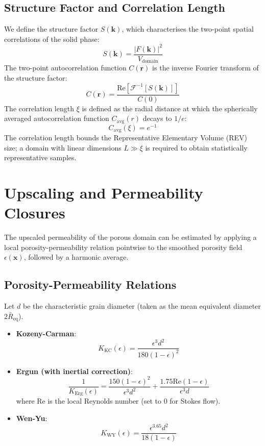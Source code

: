 \documentclass[preprint,12pt]{elsarticle}
\newcommand{\x}{\mathbf{x}}
\newcommand{\kvec}{\mathbf{k}}
\begin{document}
\subsection{Structure Factor and Correlation Length}
We define the structure factor $S(\kvec)$, which characterises the two-point spatial correlations of the solid phase:
\begin{equation}
S(\kvec) = \frac{|F(\kvec)|^2}{V_{\text{domain}}}
\end{equation}
The two-point autocorrelation function $C(\mathbf{r})$ is the inverse Fourier transform of the structure factor:
\begin{equation}
C(\mathbf{r}) = \frac{\text{Re}\left[ \mathcal{F}^{-1}[S(\kvec)] \right]}{C(0)}
\end{equation}
The correlation length $\xi$ is defined as the radial distance at which the spherically averaged autocorrelation function $C_{\text{avg}}(r)$ decays to $1/e$:
\begin{equation}
C_{\text{avg}}(\xi) = e^{-1}
\end{equation}
The correlation length bounds the Representative Elementary Volume (REV) size; a domain with linear dimensions $L \gg \xi$ is required to obtain statistically representative samples.

\section{Upscaling and Permeability Closures}
\label{sec:upscaling}

The upscaled permeability of the porous domain can be estimated by applying a local porosity-permeability relation pointwise to the smoothed porosity field $\epsilon(\x)$, followed by a harmonic average.

\subsection{Porosity-Permeability Relations}
Let $d$ be the characteristic grain diameter (taken as the mean equivalent diameter $2 \bar{R}_{\text{eq}}$).
\begin{itemize}
    \item \textbf{Kozeny-Carman}:
    \begin{equation}
    K_{\text{KC}}(\epsilon) = \frac{\epsilon^3 d^2}{180 (1-\epsilon)^2}
    \end{equation}
    \item \textbf{Ergun (with inertial correction)}:
    \begin{equation}
    \frac{1}{K_{\text{Erg}}(\epsilon)} = \frac{150 (1-\epsilon)^2}{\epsilon^3 d^2} + \frac{1.75 \text{Re} (1-\epsilon)}{\epsilon^3 d}
    \end{equation}
    where $\text{Re}$ is the local Reynolds number (set to $0$ for Stokes flow).
    \item \textbf{Wen-Yu}:
    \begin{equation}
    K_{\text{WY}}(\epsilon) = \frac{\epsilon^{3.65} d^2}{18 (1-\epsilon)}
    \end{equation}
\end{itemize}
\end{document}
